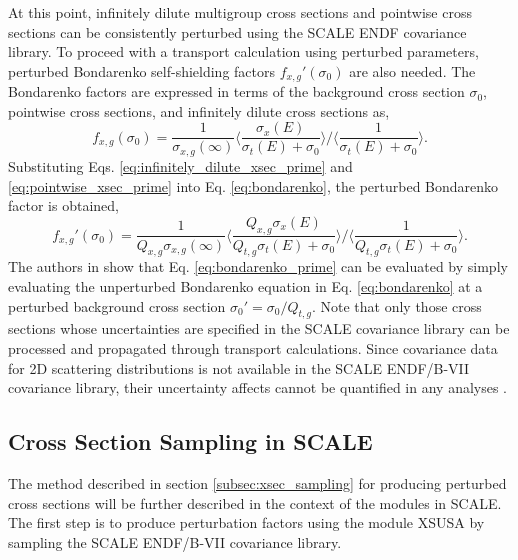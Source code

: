 At this point, infinitely dilute multigroup cross sections and pointwise cross sections can be consistently perturbed using the \ac{SCALE} \ac{ENDF} covariance library. To proceed with a transport calculation using perturbed parameters, perturbed Bondarenko self-shielding factors $f_{x,g}'(\sigma_0)$ are also needed. The Bondarenko factors are expressed in terms of the background cross section $\sigma_0$, pointwise cross sections, and infinitely dilute cross sections as,     
\begin{equation}
\label{eq:bondarenko}
   f_{x,g}(\sigma_0) = \frac{1}{\sigma_{x,g}(\infty)}
    \Big\langle \frac{\sigma_x(E)}{\sigma_t(E) + \sigma_0}\Big\rangle
     \Big/
     \Big\langle \frac{1}{\sigma_t(E) + \sigma_0}\Big\rangle.
\end{equation}
Substituting Eqs. \ref{eq:infinitely_dilute_xsec_prime} and \ref{eq:pointwise_xsec_prime} into Eq. \ref{eq:bondarenko}, the perturbed Bondarenko factor is obtained,
\begin{equation}
\label{eq:bondarenko_prime}
   f_{x,g}'(\sigma_0) = \frac{1}{Q_{x,g}\sigma_{x,g}(\infty)}
    \Big\langle \frac{Q_{x,g}\sigma_x(E)}{Q_{t,g}\sigma_t(E)+\sigma_0}\Big\rangle
     \Big/
     \Big\langle \frac{1}{Q_{t,g}\sigma_t(E) + \sigma_0}\Big\rangle.
\end{equation}
The authors in \cite{Williams_Ilas} show that Eq. \ref{eq:bondarenko_prime} can be evaluated by simply evaluating the unperturbed Bondarenko equation in Eq. 
\ref{eq:bondarenko} at a perturbed background cross section $\sigma_0' = \sigma_0/ Q_{t,g}$. Note that only those cross sections whose uncertainties are specified in the \ac{SCALE} covariance library can be processed and propagated through transport calculations. Since covariance data for 2D scattering distributions is not available in the \ac{SCALE} \ac{ENDF}/B-VII covariance library, their uncertainty affects cannot be quantified in any analyses \cite{Williams_Ilas}. 
 
\subsection{Cross Section Sampling in SCALE}
\label{subsec:scale_sampler}  

The method described in section \ref{subsec:xsec_sampling} for producing perturbed cross sections will be further described in the context of the modules in \ac{SCALE}. The first step is to produce perturbation factors using the module XSUSA by sampling the \ac{SCALE} \ac{ENDF}/B-VII covariance library. 

